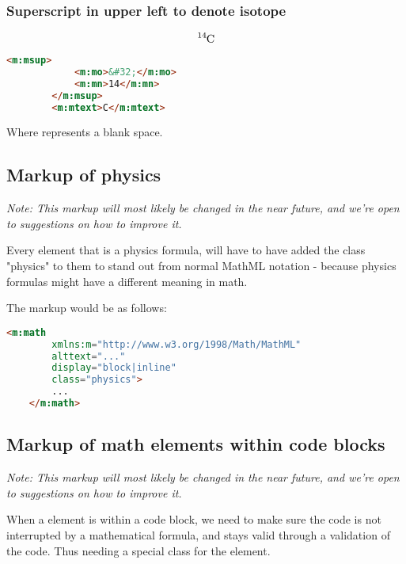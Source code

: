 \documentclass[english,a4paper,11pt]{article}
\begin{document}
\subsubsection{Superscript in upper left to denote isotope}\label{chemistry-isotope}

\begin{examples}
	\begin{equation}
		\ce{^{14}C}
	\end{equation}
	\begin{lstlisting}[language=HTML]
		<m:msup>
			<m:mo>&#32;</m:mo>
			<m:mn>14</m:mn>
		</m:msup>
		<m:mtext>C</m:mtext>
	\end{lstlisting}
	Where  represents a blank space.
\end{examples}

\subsection{Markup of physics}\label{physics}

\textit{Note: This markup will most likely be changed in the near future, and we're open to suggestions on how to improve it.}

Every  element that is a physics formula, will have to have added the class "physics" to them to stand out from normal MathML notation - because physics formulas might have a different meaning in math.

\begin{examples}
The markup would be as follows:
\begin{lstlisting}[language=HTML]
	<m:math 
	    xmlns:m="http://www.w3.org/1998/Math/MathML"
	    alttext="..."
	    display="block|inline"
		class="physics">
		...
	</m:math>
\end{lstlisting}
\end{examples}

\subsection{Markup of math elements within code blocks}

\textit{Note: This markup will most likely be changed in the near future, and we're open to suggestions on how to improve it.}

When a  element is within a code block, we need to make sure the code is not interrupted by a mathematical formula, and stays valid through a validation of the code. Thus needing a special class for the  element.
\end{document}
